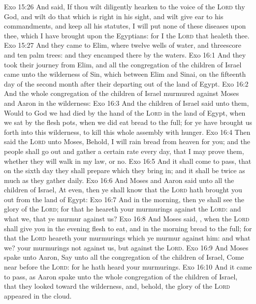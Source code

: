 \vs Exo 15:26 And said, If thou wilt diligently hearken to the voice of the \textsc{Lord} thy God, and wilt do that which is right in his sight, and wilt give ear to his commandments, and keep all his statutes, I will put none of these diseases upon thee, which I have brought upon the Egyptians: for I  the \textsc{Lord} that healeth thee.
\vs Exo 15:27 And they came to Elim, where  twelve wells of water, and threescore and ten palm trees: and they encamped there by the waters.
\vs Exo 16:1 And they took their journey from Elim, and all the congregation of the children of Israel came unto the wilderness of Sin, which  between Elim and Sinai, on the fifteenth day of the second month after their departing out of the land of Egypt.
\vs Exo 16:2 And the whole congregation of the children of Israel murmured against Moses and Aaron in the wilderness:
\vs Exo 16:3 And the children of Israel said unto them, Would to God we had died by the hand of the \textsc{Lord} in the land of Egypt, when we sat by the flesh pots,  when we did eat bread to the full; for ye have brought us forth into this wilderness, to kill this whole assembly with hunger.
\vs Exo 16:4 Then said the \textsc{Lord} unto Moses, Behold, I will rain bread from heaven for you; and the people shall go out and gather a certain rate every day, that I may prove them, whether they will walk in my law, or no.
\vs Exo 16:5 And it shall come to pass, that on the sixth day they shall prepare  which they bring in; and it shall be twice as much as they gather daily.
\vs Exo 16:6 And Moses and Aaron said unto all the children of Israel, At even, then ye shall know that the \textsc{Lord} hath brought you out from the land of Egypt:
\vs Exo 16:7 And in the morning, then ye shall see the glory of the \textsc{Lord}; for that he heareth your murmurings against the \textsc{Lord}: and what  we, that ye murmur against us?
\vs Exo 16:8 And Moses said, , when the \textsc{Lord} shall give you in the evening flesh to eat, and in the morning bread to the full; for that the \textsc{Lord} heareth your murmurings which ye murmur against him: and what  we? your murmurings  not against us, but against the \textsc{Lord}.
\vs Exo 16:9 And Moses spake unto Aaron, Say unto all the congregation of the children of Israel, Come near before the \textsc{Lord}: for he hath heard your murmurings.
\vs Exo 16:10 And it came to pass, as Aaron spake unto the whole congregation of the children of Israel, that they looked toward the wilderness, and, behold, the glory of the \textsc{Lord} appeared in the cloud.
